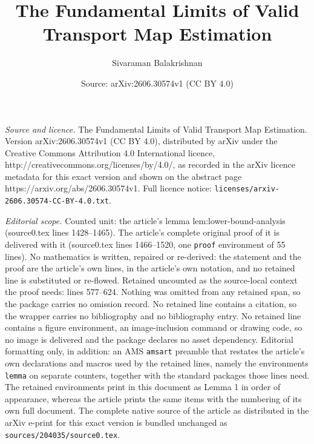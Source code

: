 \documentclass[10pt,a4paper]{amsart}
\title{The Fundamental Limits of Valid Transport Map Estimation}
\author{Sivaraman Balakrishnan}
\date{Source: arXiv:2606.30574v1 (CC BY 4.0)}
\begin{document}
\maketitle

\noindent\emph{Source and licence.} The Fundamental Limits of Valid Transport Map Estimation. Version arXiv:2606.30574v1 (CC BY 4.0), distributed by arXiv under the Creative Commons Attribution 4.0 International licence, http://creativecommons.org/licenses/by/4.0/, as recorded in the arXiv licence metadata for this exact version and shown on the abstract page https://arxiv.org/abs/2606.30574v1. Full licence notice: \texttt{licenses/arxiv-2606.30574-CC-BY-4.0.txt}.\par\smallskip

\noindent\textit{Editorial scope.} Counted unit: the article's lemma lem:lower-bound-analysis (source0.tex lines 1428--1465). The article's complete original proof of it is delivered with it (source0.tex lines 1466--1520, one \texttt{proof} environment of 55 lines). No mathematics is written, repaired or re-derived: the statement and the proof are the article's own lines, in the article's own notation, and no retained line is substituted or re-flowed.  Retained uncounted as the source-local context the proof needs: lines 577--624.  Nothing was omitted from any retained span, so the package carries no omission record.  No retained line contains a citation, so the wrapper carries no bibliography and no bibliography entry.  No retained line contains a figure environment, an image-inclusion command or drawing code, so no image is delivered and the package declares no asset dependency.  Editorial formatting only, in addition: an AMS \texttt{amsart} preamble that restates the article's own declarations and macros used by the retained lines, namely the environments \texttt{lemma} on separate counters, together with the standard packages those lines need.  The retained environments print in this document as Lemma 1 in order of appearance, whereas the article prints the same items with the numbering of its own full document.  The complete native source of the article as distributed in the arXiv e-print for this exact version is bundled unchanged as \texttt{sources/204035/source0.tex}.
\end{document}
